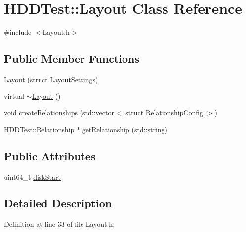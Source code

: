 \hypertarget{class_h_d_d_test_1_1_layout}{\section{H\-D\-D\-Test\-:\-:Layout Class Reference}
\label{class_h_d_d_test_1_1_layout}
}


{\ttfamily \#include $<$Layout.\-h$>$}

\subsection*{Public Member Functions}
\begin{DoxyCompactItemize}
\item 
\hyperlink{class_h_d_d_test_1_1_layout_a65643db5707927aefc6069735da99a21}{Layout} (struct \hyperlink{struct_h_d_d_test_1_1_layout_settings}{Layout\-Settings})
\item 
virtual \hyperlink{class_h_d_d_test_1_1_layout_aa12e04fdf79d0976d2020c4ee6c9305e}{$\sim$\-Layout} ()
\item 
void \hyperlink{class_h_d_d_test_1_1_layout_afeb15d353e1bb5b8089ce0fd35d00c44}{create\-Relationships} (std\-::vector$<$ struct \hyperlink{struct_h_d_d_test_1_1_relationship_config}{Relationship\-Config} $>$)
\item 
\hyperlink{class_h_d_d_test_1_1_relationship}{H\-D\-D\-Test\-::\-Relationship} $\ast$ \hyperlink{class_h_d_d_test_1_1_layout_af7aef9c0227433e1cfc6252cb85e8dc3}{get\-Relationship} (std\-::string)
\end{DoxyCompactItemize}
\subsection*{Public Attributes}
\begin{DoxyCompactItemize}
\item 
uint64\-\_\-t \hyperlink{class_h_d_d_test_1_1_layout_aeba9e8e44b4ba70259ff783680b988fe}{disk\-Start}
\end{DoxyCompactItemize}


\subsection{Detailed Description}


Definition at line 33 of file Layout.\-h.



